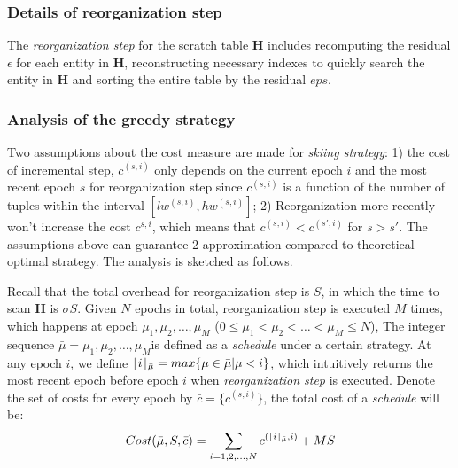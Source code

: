 \subsubsection{Details of reorganization step}
The {\em reorganization step} for the scratch table $\textbf{H}$ includes recomputing the residual $\epsilon$ for each entity in $\textbf{H}$, reconstructing necessary indexes to quickly search the entity in $\textbf{H}$ and sorting the entire table by the residual $eps$.

\subsubsection{Analysis of the greedy strategy}
Two assumptions about the cost measure are made for {\em skiing strategy}: 1) the cost of incremental step, $c^{(s, i)}$ only depends on the current epoch $i$ and the most recent epoch $s$ for reorganization step since $c^{(s, i)}$ is a function of the number of tuples within the interval $[lw^{(s,i)}, hw^{(s,i)}]$; 2) Reorganization more recently won't increase the cost $c^{s,i}$, which means that $c^{(s, i)} < c^{(s',i)}$ for $s > s'$. The assumptions above can guarantee 2-approximation compared to theoretical optimal strategy. The analysis is sketched as follows.


Recall that the total overhead for reorganization step is $S$, in which the time to scan $\textbf{H}$ is $\sigma S$. Given $N$ epochs in total, reorganization step is executed $M$ times, which happens at epoch $\mu_1, \mu_2,\dots, \mu_M$ ($0 \leq \mu_1 < \mu_2 < \dots < \mu_M \leq N$), The integer sequence $\bar{\mu} = \mu_1, \mu_2,\dots, \mu_M$is defined as a {\em schedule} under a certain strategy. At any epoch $i$, we define $\lfloor i\rfloor_{\bar{\mu}} = max\{\mu \in \bar{\mu} | \mu < i\}$, which intuitively returns the most recent epoch before epoch $i$ when {\em reorganization step} is executed. Denote the set of costs for every epoch by $\bar{c} = \{c^{(s,i)}\}$, the total cost of a {\em schedule} will be:
\begin{equation}\label{eq: cost}
    Cost(\bar{\mu}, S, \bar{c}) = \sum_{i=1,2,\dots,N}c^{(\lfloor i\rfloor_{\bar{\mu}}, i)} + MS
\end{equation}


